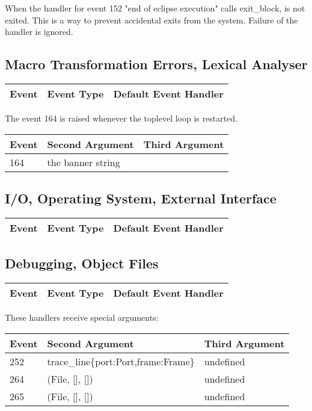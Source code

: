 When the handler for event 152 "end of eclipse execution" calls exit_block,
{\eclipse}
is not exited. This is a way to prevent
accidental exits from the system. Failure of the handler is ignored.

\subsection{Macro Transformation Errors, Lexical Analyser}
\begin{tabular}{|p{1.2cm}p{8cm}p{4.5cm}|}
\hline
{\bf Event} & {\bf Event Type} & {\bf Default Event Handler}\\
\hline

\hline
\end{tabular}

\medskip
The event 164 is raised whenever the toplevel loop is restarted.
\medskip

\noindent
\begin{tabular}{p{1.2cm}p{8cm}p{4.5cm}}
{\bf Event} & {\bf Second Argument} & {\bf Third Argument}\\
\hline
164 & the banner string \\
\hline
\end{tabular}
\vspace*{\fill}

\subsection{I/O, Operating System, External Interface}
\begin{tabular}{|p{1.2cm}p{8cm}p{4.5cm}|}
\hline
{\bf Event} & {\bf Event Type} & {\bf Default Event Handler}\\
\hline

\hline
\end{tabular}

\subsection{Debugging, Object Files}
\begin{tabular}{|p{1.2cm}p{8cm}p{4.5cm}|}
\hline
{\bf Event} & {\bf Event Type} & {\bf Default Event Handler}\\
\hline

\hline
\end{tabular}

\newpage
These handlers receive special arguments:

\noindent
\begin{tabular}{p{1.2cm}p{8cm}p{4.5cm}}
{\bf Event} & {\bf Second Argument} & {\bf Third Argument}\\
\hline
252 & trace_line\{port:Port,frame:Frame\} & undefined \\
264 & (File, [], []) & undefined \\
265 & (File, [], []) & undefined \\
\hline
\end{tabular}
\vspace*{\fill}

